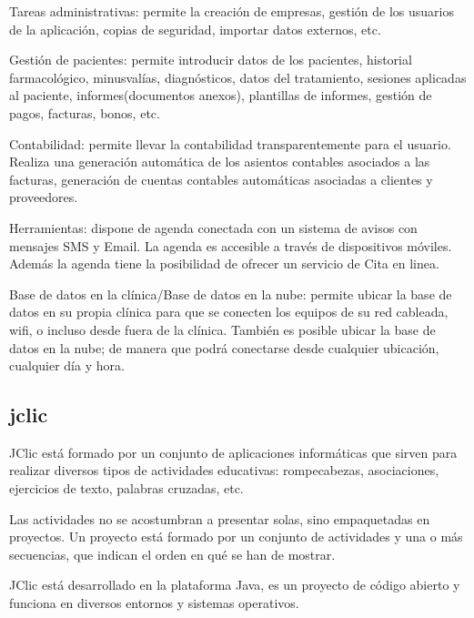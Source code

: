 Tareas administrativas: permite la creación de empresas, gestión de los usuarios de la aplicación, copias de seguridad, importar datos externos, etc.

Gestión de pacientes: permite introducir datos de los pacientes, historial farmacológico, minusvalías, diagnósticos, datos del tratamiento, sesiones aplicadas al paciente, informes(documentos anexos), plantillas de informes, gestión de pagos, facturas, bonos, etc. 

Contabilidad: permite llevar la contabilidad transparentemente para el usuario. Realiza una generación automática de los asientos contables asociados a las facturas, generación de cuentas contables automáticas asociadas a clientes y proveedores. 

Herramientas: dispone de agenda conectada con un sistema de avisos con mensajes SMS y Email. La agenda es accesible a través de dispositivos móviles. Además la agenda tiene la posibilidad de ofrecer un servicio de Cita en linea.

Base de datos en la clínica/Base de datos en la nube: permite ubicar la base de datos en su propia clínica para que se conecten los equipos de su red cableada, wifi, o incluso desde fuera de la clínica. También es posible ubicar la base de datos en la nube; de manera que podrá conectarse desde cualquier ubicación, cualquier día y hora. \cite{insight}

\vspace{1cm}

\subsection{jclic}
JClic está formado por un conjunto de aplicaciones informáticas que sirven para realizar diversos tipos de actividades educativas: rompecabezas, asociaciones, ejercicios de texto, palabras cruzadas, etc.

Las actividades no se acostumbran a presentar solas, sino empaquetadas en proyectos. Un proyecto está formado por un conjunto de actividades y una o más secuencias, que indican el orden en qué se han de mostrar.

JClic está desarrollado en la plataforma Java, es un proyecto de código abierto y funciona en diversos entornos y sistemas operativos.\cite{jclic}
